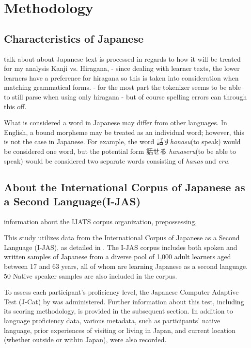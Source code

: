 \chapter{Methodology}

\section{Characteristics of Japanese}
talk about about Japanese text is processed in regards to how it will be treated for my analysis
   Kanji vs. Hiragana, - since dealing with learner texts, the lower learners have a preference for hiragana so this
is taken into consideration when matching grammatical forms. - for the most part the tokenizer seems to be able to
still parse when using only hiragana - but of course spelling errors can through this off.

What is considered a word in Japanese may differ from other languages. In English, a bound morpheme may be treated as an individual word; however, this is not the case in Japanese. For example, the word 話す\textit{hanasu}(to speak) would be considered one word, but the potential form 話せる \textit{hanaseru}(to be able to speak) would be considered two separate words consisting of \textit{hanas} and \textit{eru}.

\section{About the International Corpus of Japanese as a Second Language(I-JAS)}
information about the IJATS corpus organization, prepossessing,

This study utilizes data from the International Corpus of Japanese as a Second Language (I-JAS), as detailed in \citet{Sakoda2020}.  The I-JAS corpus includes both spoken and written samples of Japanese from a diverse pool of 1,000 adult learners aged between 17 and 63 years, all of whom are learning Japanese as a second language. 50 Native speaker samples are also included in the corpus.

To assess each participant's proficiency level, the Japanese Computer Adaptive Test (J-Cat) by \citet{Imai2009} was administered. Further information about this test, including its scoring methodology, is provided in the subsequent section. In addition to language proficiency data, various metadata, such as participants' native language, prior experiences of visiting or living in Japan, and current location (whether outside or within Japan), were also recorded.

